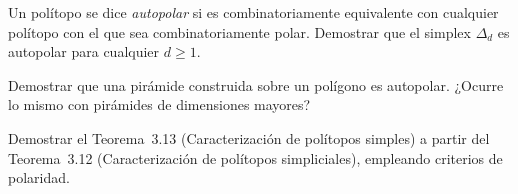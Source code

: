 \documentclass[a4paper,12pt]{article}
\begin{document}
\begin{exerciselist}
\item Un polítopo se dice \emph{autopolar} si es combinatoriamente equivalente con cualquier polítopo con el que sea combinatoriamente polar. Demostrar que el simplex $\Delta_d$ es autopolar para cualquier $d \geq 1$.

\item Demostrar que una pirámide construida sobre un polígono es autopolar. ¿Ocurre lo mismo con pirámides de dimensiones mayores?

\item Demostrar el Teorema~3.13 (Caracterización de polítopos simples) a partir del Teorema~3.12 (Caracterización de polítopos simpliciales), empleando criterios de polaridad.

\end{exerciselist}
\end{document}
